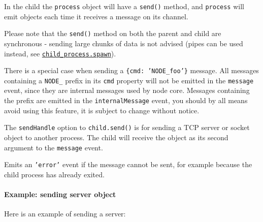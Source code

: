 In the child the \texttt{process} object will have a \texttt{send()}
method, and \texttt{process} will emit objects each time it receives a
message on its channel.

Please note that the \texttt{send()} method on both the parent and child
are synchronous - sending large chunks of data is not advised (pipes can
be used instead, see
\hyperref[childux5fprocessux5fchildux5fprocessux5fspawnux5fcommandux5fargsux5foptions]{\texttt{child\_process.spawn}}).

There is a special case when sending a \texttt{\{cmd: 'NODE\_foo'\}}
message. All messages containing a \texttt{NODE\_} prefix in its
\texttt{cmd} property will not be emitted in the \texttt{message} event,
since they are internal messages used by node core. Messages containing
the prefix are emitted in the \texttt{internalMessage} event, you should
by all means avoid using this feature, it is subject to change without
notice.

The \texttt{sendHandle} option to \texttt{child.send()} is for sending a
TCP server or socket object to another process. The child will receive
the object as its second argument to the \texttt{message} event.

Emits an \texttt{'error'} event if the message cannot be sent, for
example because the child process has already exited.

\paragraph{Example: sending server
object}\label{example-sending-server-object}

Here is an example of sending a server:

\begin{Shaded}
\begin{Highlighting}[]
 \NormalTok{(}\NormalTok{(}\NormalTok{);}

 \NormalTok{(}\NormalTok{();}
\NormalTok{(}\NormalTok{, } 
  \NormalTok{(}\NormalTok{);}
\NormalTok{\});}
\NormalTok{(}\NormalTok{, }\NormalTok{() \{}
  \NormalTok{(}
\NormalTok{\});}
\end{Highlighting}
\end{Shaded}


